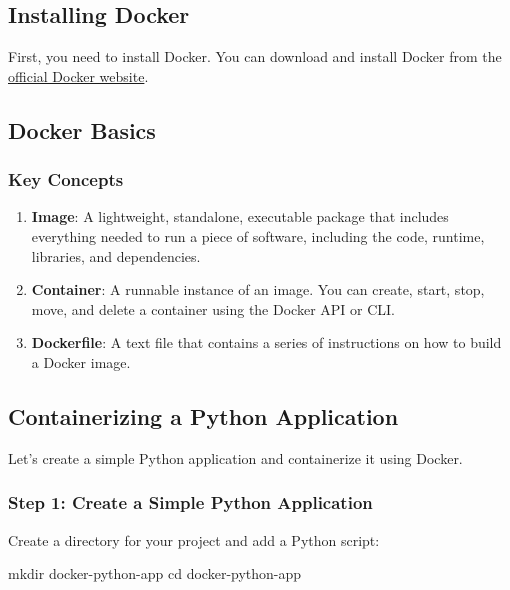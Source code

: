 \documentclass[
  letterpaper,
  DIV=11,
  numbers=noendperiod]{scrreprt}
\newenvironment{Shaded}{\begin{snugshade}}{\end{snugshade}}
\newcommand{\BuiltInTok}[1]{\textcolor[rgb]{0.00,0.23,0.31}{#1}}
\newcommand{\FunctionTok}[1]{\textcolor[rgb]{0.28,0.35,0.67}{#1}}
\newcommand{\NormalTok}[1]{\textcolor[rgb]{0.00,0.23,0.31}{#1}}
\providecommand{\tightlist}{%
  \setlength{\itemsep}{0pt}\setlength{\parskip}{0pt}}\usepackage{longtable,booktabs,array}
\begin{document}
\subsection{Installing Docker}\label{installing-docker}

First, you need to install Docker. You can download and install Docker
from the \href{https://www.docker.com/products/docker-desktop}{official
Docker website}.

\subsection{Docker Basics}\label{docker-basics}

\subsubsection{Key Concepts}\label{key-concepts-2}

\begin{enumerate}
\def\labelenumi{\arabic{enumi}.}
\tightlist
\item
  \textbf{Image}: A lightweight, standalone, executable package that
  includes everything needed to run a piece of software, including the
  code, runtime, libraries, and dependencies.
\item
  \textbf{Container}: A runnable instance of an image. You can create,
  start, stop, move, and delete a container using the Docker API or CLI.
\item
  \textbf{Dockerfile}: A text file that contains a series of
  instructions on how to build a Docker image.
\end{enumerate}

\subsection{Containerizing a Python
Application}\label{containerizing-a-python-application}

Let's create a simple Python application and containerize it using
Docker.

\subsubsection{Step 1: Create a Simple Python
Application}\label{step-1-create-a-simple-python-application}

Create a directory for your project and add a Python script:

\begin{Shaded}
\begin{Highlighting}[]
\FunctionTok{mkdir}\NormalTok{ docker{-}python{-}app}
\BuiltInTok{cd}\NormalTok{ docker{-}python{-}app}
\end{Highlighting}
\end{Shaded}
\end{document}
